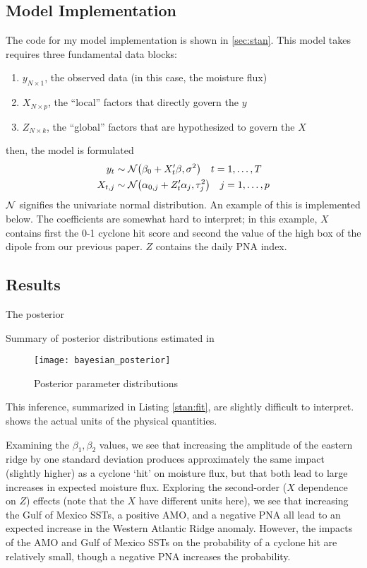 \documentclass[12pt]{article}
\begin{document}
\subsection{Model Implementation}

The \stan code for my model implementation is shown in \cref{sec:stan}.
This model takes requires three fundamental data blocks:
\begin{enumerate}
    \item $y_{N \times 1}$, the observed data (in this case, the moisture flux)
    \item $X_{N \times p}$, the ``local'' factors that directly govern the $y$
    \item $Z_{N \times k}$, the ``global'' factors that are hypothesized to govern the $X$
\end{enumerate}
then, the model is formulated
\begin{align}
    y_t & \sim \mathcal{N} \qty(\beta_0 + X'_t \beta, \sigma^2) \quad t = 1, \ldots, T \label{eq:yX}\\
    X_{t,j} &\sim \mathcal{N} \qty(\alpha_{0,j} + Z'_t \alpha_j, \tau_j^2) \quad j = 1, \ldots, p \label{eq:XZ}
\end{align}
$\mathcal{N}$ signifies the univariate normal distribution.
An example of this is implemented below.
The coefficients are somewhat hard to interpret; in this example, $X$ contains first the 0-1 cyclone hit score and second the value of the high box of the dipole from our previous paper.
$Z$ contains the daily PNA index.

\subsection{Results}

The posterior
\begin{lstfloat}
    
    \caption{Summary of posterior distributions estimated in \stan  \label{stan:fit}}
\end{lstfloat}
\begin{figure}
    \centering
    \texttt{[image: bayesian\_posterior]}
    \caption{Posterior parameter distributions}
    \label{label:stan-plot}
\end{figure}


This inference, summarized in Listing \ref{stan:fit}, are slightly difficult to interpret.
 shows the actual units of the physical quantities.

Examining the $\beta_1,\beta_2$ values, we see that increasing the amplitude of the eastern ridge by one standard deviation produces approximately the same impact (slightly higher) as a cyclone `hit' on moisture flux, but that both lead to large increases in expected moisture flux.
Exploring the second-order ($X$ dependence on $Z$) effects (note that the $X$ have different units here), we see that increasing the Gulf of Mexico SSTs, a positive AMO, and a negative PNA all lead to an expected increase in the Western Atlantic Ridge anomaly.
However, the impacts of the AMO and Gulf of Mexico SSTs on the probability of a cyclone hit are relatively small, though a negative PNA increases the probability.
\end{document}
